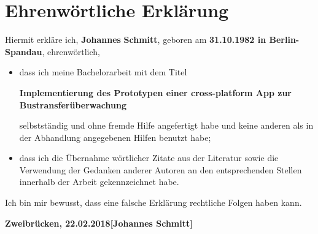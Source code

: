 \chapter*{Ehrenwörtliche Erklärung}
Hiermit erkläre ich, \textbf{Johannes} \textbf{Schmitt}, geboren am
\textbf{31.10.1982 in Berlin-Spandau}, ehrenwörtlich,
\begin{itemize}
\item dass ich meine Bachelorarbeit mit dem Titel

\textbf{Implementierung des Prototypen einer cross-platform
App zur Bustransfer\"uberwachung}

selbstständig und ohne fremde Hilfe angefertigt habe und keine anderen als in der
Abhandlung angegebenen Hilfen benutzt habe;
\item dass ich die Übernahme wörtlicher Zitate aus der Literatur
sowie die Verwendung der Gedanken anderer Autoren an den entsprechenden
Stellen innerhalb der Arbeit gekennzeichnet habe.
\end{itemize}
Ich bin mir bewusst, dass eine falsche Erklärung rechtliche Folgen haben kann.
\vspace*{3cm}

\textbf{Zweibrücken, 22.02.2018}\hfill\textbf{[Johannes Schmitt]}
